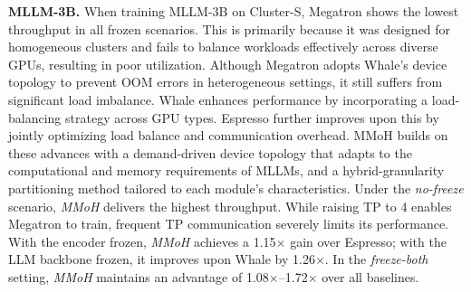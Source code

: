 \documentclass[conference]{IEEEtran}
\begin{document}
\textbf{MLLM-3B.}
When training MLLM-3B on Cluster-S, Megatron shows the lowest throughput in all frozen scenarios. This is primarily because it was designed for homogeneous clusters and fails to balance workloads effectively across diverse GPUs, resulting in poor utilization. Although Megatron adopts Whale's device topology to prevent OOM errors in heterogeneous settings, it still suffers from significant load imbalance.
Whale enhances performance by incorporating a load-balancing strategy across GPU types. Espresso further improves upon this by jointly optimizing load balance and communication overhead.
MMoH builds on these advances with a demand-driven device topology that adapts to the computational and memory requirements of MLLMs, and a hybrid-granularity partitioning method tailored to each module’s characteristics.
Under the \textit{no-freeze} scenario, \textit{MMoH} delivers the highest throughput. While raising TP to 4 enables Megatron to train, frequent TP communication severely limits its performance.
With the encoder frozen, \textit{MMoH} achieves a 1.15$\times$ gain over Espresso; with the LLM backbone frozen, it improves upon Whale by 1.26$\times$.
In the \textit{freeze-both} setting, \textit{MMoH} maintains an advantage of 1.08$\times$–1.72$\times$ over all baselines.

\end{document}
